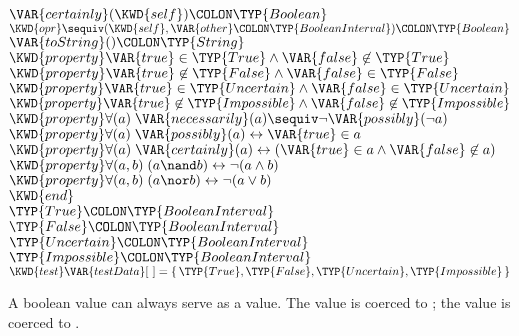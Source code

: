 \begin{Fortress}
\(  \VAR{certainly}(\KWD{self})\COLON \TYP{Boolean}\)\\
\(  \KWD{opr} \mathord{\sequiv}(\KWD{self}, \VAR{other}\COLON \TYP{BooleanInterval})\COLON \TYP{Boolean}\)\\
\(  \VAR{toString}()\COLON \TYP{String}\)\\
\(  \KWD{property} \VAR{true} \in \TYP{True} \wedge \VAR{false} \not\in \TYP{True}\)\\
\(  \KWD{property} \VAR{true} \not\in \TYP{False} \wedge \VAR{false} \in \TYP{False}\)\\
\(  \KWD{property} \VAR{true} \in \TYP{Uncertain} \wedge \VAR{false} \in \TYP{Uncertain}\)\\
\(  \KWD{property} \VAR{true} \not\in \TYP{Impossible} \wedge \VAR{false} \not\in \TYP{Impossible}\)\\
\(  \KWD{property} \forall (a)\; \VAR{necessarily}(a) \sequiv \neg \VAR{possibly}(\neg a)\)\\
\(  \KWD{property} \forall (a)\; \VAR{possibly}(a) \leftrightarrow \VAR{true} \in a\)\\
\(  \KWD{property} \forall (a)\; \VAR{certainly}(a) \leftrightarrow (\VAR{true} \in a \wedge \VAR{false} \not\in a)\)\\
\(  \KWD{property} \forall (a,b)\; (a \nand b) \leftrightarrow \neg (a \wedge b)\)\\
\(  \KWD{property} \forall (a,b)\; (a \nor b) \leftrightarrow \neg (a \vee b)\)\-\\\poptabs
\(\KWD{end}\)\\
\(\TYP{True}\COLON \TYP{BooleanInterval}\)\\
\(\TYP{False}\COLON \TYP{BooleanInterval}\)\\
\(\TYP{Uncertain}\COLON \TYP{BooleanInterval}\)\\
\(\TYP{Impossible}\COLON \TYP{BooleanInterval}\)\\
\(\KWD{test} \VAR{testData}[~] = \{\,\TYP{True}, \TYP{False}, \TYP{Uncertain}, \TYP{Impossible}\,\}\)
\end{Fortress}



A boolean value can always serve as a  value.
The value  is coerced to ; the value  is coerced to .




